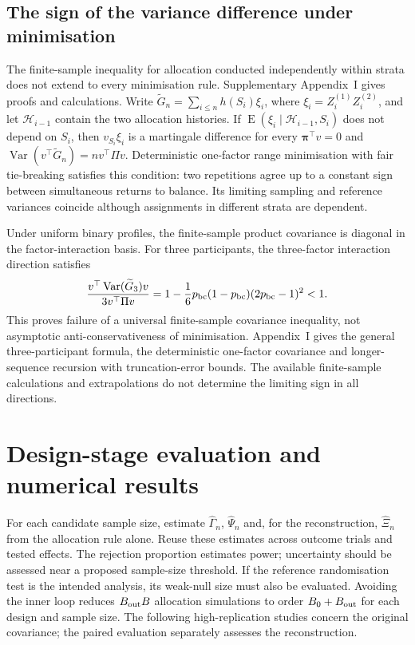 \documentclass[12pt,a4paper]{article}
\theoremstyle{definition}
\newcommand{\E}{\operatorname E}
\newcommand{\Var}{\operatorname{Var}}
\begin{document}
\subsection{The sign of the variance difference under minimisation}\label{sec:min-sign}
The finite-sample inequality for allocation conducted independently within strata does not extend to every minimisation rule. Supplementary Appendix~I gives proofs and calculations. Write $\widetilde G_n=\sum_{i\le n}h(S_i)\xi_i$, where $\xi_i=Z_i^{(1)}Z_i^{(2)}$, and let $\mathcal H_{i-1}$ contain the two allocation histories. If $\E(\xi_i\mid\mathcal H_{i-1},S_i)$ does not depend on $S_i$, then $v_{S_i}\xi_i$ is a martingale difference for every $\bm\pi^\top v=0$ and $\Var(v^\top\widetilde G_n)=n v^\top\Pi v$. Deterministic one-factor range minimisation with fair tie-breaking satisfies this condition: two repetitions agree up to a constant sign between simultaneous returns to balance. Its limiting sampling and reference variances coincide although assignments in different strata are dependent.

Under uniform binary profiles, the finite-sample product covariance is diagonal in the factor-interaction basis. For three participants, the three-factor interaction direction satisfies
\[
 \frac{v^\top\Var(\widetilde G_3)v}{3v^\top\Pi v}
       =1-\frac16p_{\rm bc}(1-p_{\rm bc})(2p_{\rm bc}-1)^2<1.
\]
This proves failure of a universal finite-sample covariance inequality, not asymptotic anti-conservativeness of minimisation. Appendix~I gives the general three-participant formula, the deterministic one-factor covariance and longer-sequence recursion with truncation-error bounds. The available finite-sample calculations and extrapolations do not determine the limiting sign in all directions.

\section{Design-stage evaluation and numerical results}\label{sec:algorithm}
For each candidate sample size, estimate $\widehat\Gamma_n$, $\widehat\Psi_n$ and, for the reconstruction, $\widehat\Xi_n$ from the allocation rule alone. Reuse these estimates across outcome trials and tested effects. The rejection proportion estimates power; uncertainty should be assessed near a proposed sample-size threshold. If the reference randomisation test is the intended analysis, its weak-null size must also be evaluated. Avoiding the inner loop reduces $B_{\rm out}B$ allocation simulations to order $B_0+B_{\rm out}$ for each design and sample size. The following high-replication studies concern the original covariance; the paired evaluation separately assesses the reconstruction.
\end{document}
